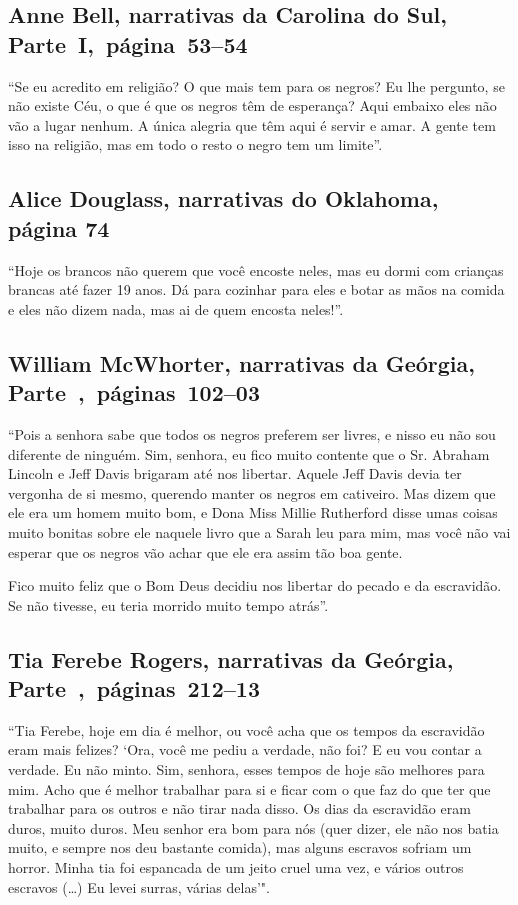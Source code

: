 \subsection{Anne Bell, narrativas da Carolina do Sul, Parte~I,~página~53--54} \label{ref22}

``Se eu acredito em religião? O que mais tem para os negros? Eu lhe
pergunto, se não existe Céu, o que é que os negros têm de esperança?
Aqui embaixo eles não vão a lugar nenhum. A única alegria que têm aqui é
servir e amar. A gente tem isso na religião, mas em todo o resto o negro
tem um limite''. \enlargethispage{\baselineskip}

\subsection{Alice Douglass, narrativas do Oklahoma, página 74} \label{ref74}

``Hoje os brancos não querem que você encoste neles, mas eu dormi com
crianças brancas até fazer 19 anos. Dá para cozinhar para eles e botar
as mãos na comida e eles não dizem nada, mas ai de quem encosta neles!''.

\subsection{William McWhorter, narrativas da Geórgia, Parte~,~páginas~102--03}
\label{ref191}

``Pois a senhora sabe que todos os negros preferem ser livres, e nisso
eu não sou diferente de ninguém. Sim, senhora, eu fico muito contente
que o Sr. Abraham Lincoln e Jeff Davis brigaram até nos libertar. Aquele
Jeff Davis devia ter vergonha de si mesmo, querendo manter os negros em
cativeiro. Mas dizem que ele era um homem muito bom, e Dona Miss Millie
Rutherford disse umas coisas muito bonitas sobre ele naquele livro que a
Sarah leu para mim, mas você não vai esperar que os negros vão achar que
ele era assim tão boa gente.

Fico muito feliz que o Bom Deus decidiu nos libertar do pecado e da
escravidão. Se não tivesse, eu teria morrido muito tempo atrás''.

\subsection{Tia Ferebe Rogers, narrativas da Geórgia, Parte~,~páginas~212--13}
\label{ref228}

``Tia Ferebe, hoje em dia é melhor, ou você acha que os tempos da
escravidão eram mais felizes? `Ora, você me pediu a verdade, não foi? E
eu vou contar a verdade. Eu não minto. Sim, senhora, esses tempos de
hoje são melhores para mim. Acho que é melhor trabalhar para si e ficar
com o que faz do que ter que trabalhar para os outros e não tirar nada
disso. Os dias da escravidão eram duros, muito duros. Meu senhor era bom
para nós (quer dizer, ele não nos batia muito, e sempre nos deu bastante
comida), mas alguns escravos sofriam um horror. Minha tia foi espancada
de um jeito cruel uma vez, e vários outros escravos (\ldots{}) Eu levei
surras, várias delas'".

